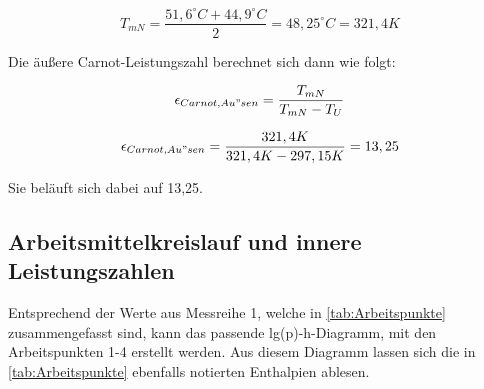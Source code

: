 $$T_{mN}=\frac{51,6^{\circ}C+44,9^{\circ}C}{2}=48,25^{\circ}C= 321,4 K$$

Die äußere Carnot-Leistungszahl berechnet sich dann wie folgt: 

\begin{equation}
\epsilon_{Carnot, Au"sen} = \frac{T_{mN}}{T_{mN}-T_{U}}
\label{eq:110623_aeußere Carnot Leistungszahl}
\end{equation}

$$\epsilon_{Carnot, Au"sen} = \frac{321,4 K}{321,4 K-297,15K} = 13,25$$

Sie beläuft sich dabei auf 13,25.

\subsection{Arbeitsmittelkreislauf und innere Leistungszahlen}
Entsprechend der Werte aus Messreihe 1, welche in \autoref{tab:Arbeitspunkte} zusammengefasst sind, kann das passende
lg(p)-h-Diagramm, mit den Arbeitspunkten 1-4 erstellt werden. Aus diesem Diagramm lassen sich die in \autoref{tab:Arbeitspunkte} ebenfalls
notierten Enthalpien ablesen.

